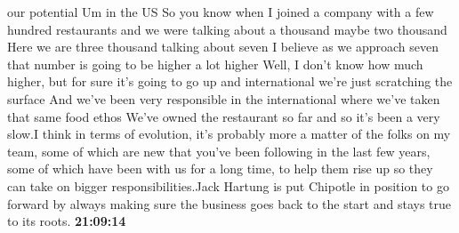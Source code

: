 \documentclass{article}%
\begin{document}
our potential Um in the US So you know when I joined a company with a few hundred restaurants and we were talking about a thousand maybe two thousand Here we are three thousand talking about seven I believe as we approach seven that number is going to be higher a lot higher Well, I don't know how much higher, but for sure it's going to go up and international we're just scratching the surface And we've been very responsible in the international where we've taken that same food ethos We've owned the restaurant so far and so it's been a very slow.I think in terms of evolution, it's probably more a matter of the folks on my team, some of which are new that you've been following in the last few years, some of which have been with us for a long time, to help them rise up so they can take on bigger responsibilities.Jack Hartung is put Chipotle in position to go forward by always making sure the business goes back to the start and stays true to its roots.%
\textbf{21:09:14}%
\newline%
\end{document}
